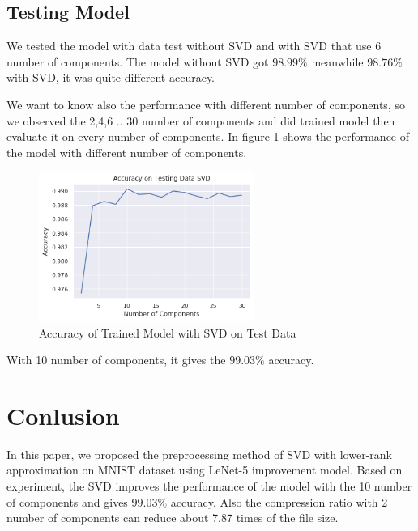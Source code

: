 \documentclass[conference]{IEEEtran}
\begin{document}
\subsection{Testing Model}
We tested the model with data test without SVD and with SVD that use 6 number of components. The model without SVD got $98.99 \%$ meanwhile $98.76 \%$ with SVD, it was quite different accuracy.

We want to know also the performance with different number of components, so we observed the 2,4,6 .. 30 number of components and did trained model then evaluate it on every number of components. 
In figure \ref{fig:acc_svd_k} shows the performance of the model with different number of components.
\begin{figure}[htbp]
    \centerline{\includegraphics[width=7cm]{SVD_perf_k.png}}
    \caption{Accuracy of Trained Model with SVD on Test Data}
    \label{fig:acc_svd_k}
\end{figure}
With 10 number of components, it gives the $99.03 \%$ accuracy. 

\section{Conlusion}
In this paper, we proposed the preprocessing method of SVD with lower-rank approximation on MNIST dataset using LeNet-5 improvement model.
Based on experiment, the SVD improves the performance of the model with the 10 number of components and gives $99.03 \%$ accuracy.
Also the compression ratio with 2 number of components can reduce about 7.87 times of the file size.



\end{document}
